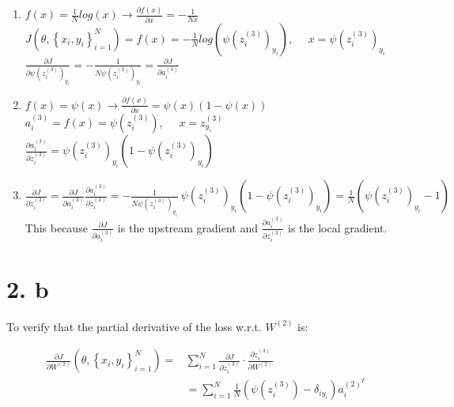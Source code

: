 \documentclass[
	12pt, %
]{fphw}
\begin{document}
\begin{enumerate}
\item $f(x) = \frac{1}{N} log(x) \rightarrow \frac{\partial f(x)}{\partial x} = -\frac{1}{Nx}$  \\ 

$J\left(\theta,\left\{x_{i}, y_{i}\right\}_{i=1}^{N}\right) = f(x) = - \frac {1}{N} log(\psi (z_{i}^{(3)})_{y_{i}}),\ \ \ \ \ \  x = \psi(z_{i}^{(3)})_{y_{i}} $ \\ 

$\frac{\partial J}{\partial \psi(z_{i}^{(3)})_{y_{i}}} = - \frac{1}{N \psi(z_{i}^{(3)})_{y_{i}}} = \frac{\partial J}{\partial a_{i}^{(3)}}$ \\


\item $f(x) = \psi(x) \rightarrow \frac{\partial f(x)}{\partial x} = \psi (x) (1 - \psi(x))$ \\

$ a_{i}^{(3)} = f(x) = \psi(z_{i}^{(3)}),\ \ \ \ \ \ x = z_{y_{i}}^{(3)}$ \\

$ \frac{\partial a_{i}^{(3)}}{\partial z_{i}^{(3)}} = \psi(z_{i}^{(3)})_{y_{i}} (1 - \psi(z_{i}^{(3)})_{y_{i}}) $ \\

\item $\frac{\partial J}{\partial z_{i}^{(3)}} = \frac{\partial J}{\partial a_{i}^{(3)}} \frac{\partial a_{i}^{(3)}}{\partial z_{i}^{(3)}} = - \frac{1}{N \psi(z_{i}^{(3)})_{y_{i}}} \ \psi(z_{i}^{(3)})_{y_{i}} (1 - \psi(z_{i}^{(3)})_{y_{i}}) = \frac{1}{N} (\psi(z_{i}^{(3)})_{y_{i}} - 1)$ \\

This because $\frac{\partial J}{\partial a_{i}^{(3)}}$ is the upstream gradient and $\frac{\partial a_{i}^{(3)}}{\partial z_{i}^{(3)}}$ is the local gradient.

\end{enumerate}

\newpage
\section* {2. b}



To verify that the partial derivative of the loss w.r.t. $W^{(2)}$ is:

$$
\begin{aligned}
\frac{\partial J}{\partial W^{(2)}}\left(\theta,\left\{x_{i}, y_{i}\right\}_{i=1}^{N}\right)=& \sum_{i=1}^{N} \frac{\partial J}{\partial z_{i}^{(3)}} \cdot \frac{\partial z_{i}^{(3)}}{\partial W^{(2)}} \\
&=\sum_{i=1}^{N} \frac{1}{N}\left(\psi\left(z_{i}^{(3)}\right)-\delta_{i y_{i}}\right) a_{i}^{(2)^{T}}
\end{aligned}
$$
\end{document}
